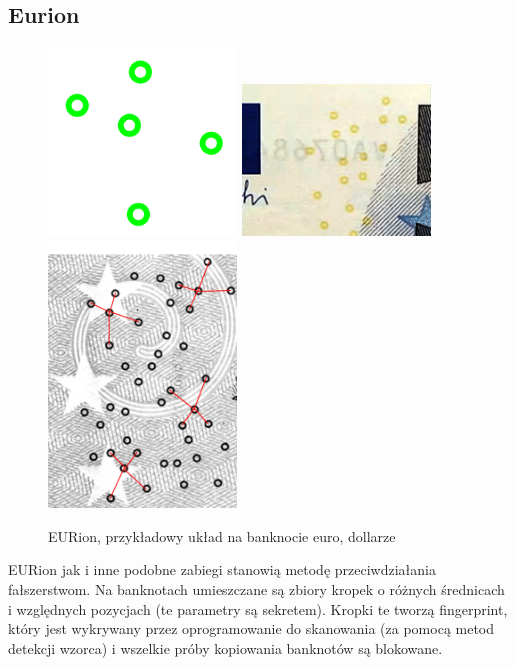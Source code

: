 \documentclass{article}
\begin{document}
\subsection{Eurion}
\begin{figure}[H]
	\centering
	\includegraphics[width=5cm]{eurion}
	\includegraphics[width=5cm]{euro}
	\includegraphics[width=5cm]{close}
	\caption{EURion, przykładowy układ na banknocie euro, dollarze}
\end{figure}
EURion jak i inne podobne zabiegi stanowią metodę przeciwdziałania fałszerstwom. Na banknotach umieszczane
są zbiory kropek o różnych średnicach i względnych pozycjach (te parametry są sekretem). Kropki te tworzą
fingerprint, który jest wykrywany przez oprogramowanie do skanowania (za pomocą metod detekcji wzorca) i
wszelkie próby kopiowania banknotów są blokowane.  
\end{document}

